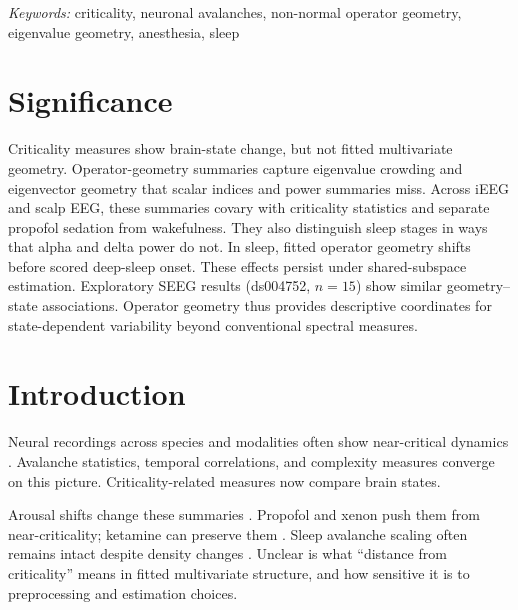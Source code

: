 \documentclass[preprint,12pt,nonatbib]{elsarticle}
\begin{document}
\begin{center}
\begin{minipage}{0.86\textwidth}
\footnotesize\noindent\textit{Keywords:} criticality, neuronal avalanches, non-normal operator geometry, eigenvalue geometry, anesthesia, sleep\par
\end{minipage}
\end{center}

\clearpage

\section*{Significance}
Criticality measures show brain-state change, but not fitted multivariate geometry. Operator-geometry summaries capture eigenvalue crowding and eigenvector geometry that scalar indices and power summaries miss. Across iEEG and scalp EEG, these summaries covary with criticality statistics and separate propofol sedation from wakefulness. They also distinguish sleep stages in ways that alpha and delta power do not. In sleep, fitted operator geometry shifts before scored deep-sleep onset. These effects persist under shared-subspace estimation. Exploratory SEEG results (ds004752, $n=15$) show similar geometry--state associations. Operator geometry thus provides descriptive coordinates for state-dependent variability beyond conventional spectral measures.



\section{Introduction}

Neural recordings across species and modalities often show near-critical dynamics \citep{Beggs2003,Hardstone2012,Lombardi2023,Schartner2015,Shriki2013,Srinivasan2024}. Avalanche statistics, temporal correlations, and complexity measures converge on this picture. Criticality-related measures now compare brain states.

Arousal shifts change these summaries \citep{Angiolelli2025,Gervais2023,Maschke2024}. Propofol and xenon push them from near-criticality; ketamine can preserve them \citep{Curic2024,Maschke2024}. Sleep avalanche scaling often remains intact despite density changes \citep{Huo2024,Pereira2023}. Unclear is what ``distance from criticality'' means in fitted multivariate structure, and how sensitive it is to preprocessing and estimation choices.
\end{document}
